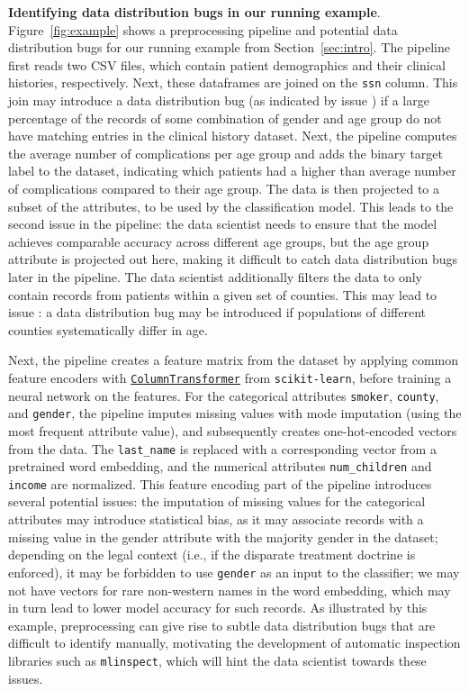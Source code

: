 \documentclass[11pt]{article}
\newcommand*{\ie}{i.e.,\xspace}
\newcommand{\sklearn}{\stt{scikit-learn}\xspace}
\newcommand{\mlinspect}{\stt{mlinspect}\xspace}
\newcommand{\header}[1]{\vspace{1mm}\noindent\textbf{#1}.}
\newcommand*\circled[1]{\tikz[baseline=(char.base)]{\node[shape=circle,fill=black,draw,inner sep=0.6pt] (char) {\textcolor{white}{\footnotesize \textbf{#1}}};}}
\newcommand{\shref}[2]{{\footnotesize\href{#1}{#2}}}
\newcommand{\stt}[1]{{\footnotesize\texttt{#1}}}
\begin{document}
\header{Identifying data distribution bugs in our running example} Figure~\ref{fig:example} shows a  preprocessing pipeline and potential data distribution bugs for our running example from Section~\ref{sec:intro}. The pipeline first reads two CSV files, which contain patient demographics and their clinical histories, respectively. Next, these dataframes are joined on the \stt{ssn} column. This join may introduce a data distribution bug (as indicated by issue \circled{1}) if a large percentage of the records of some combination of gender and age group do not have matching entries in the clinical history dataset. Next, the pipeline computes the average number of complications per age group and adds the binary target label to the dataset,  indicating which patients had a higher than average number of complications compared to their age group. The data is then projected to a subset of the attributes, to be used by the classification model. This leads to the second issue \circled{2} in the pipeline: the data scientist needs to ensure that the model achieves comparable accuracy across different age groups, but the age group attribute is projected out here, making it difficult to catch data distribution bugs later in the pipeline. The data scientist additionally filters the data to only contain records from patients within a given set of counties.  This may  lead to issue \circled{3}: a data distribution bug may be introduced if populations of different counties systematically differ in age.

Next, the pipeline creates a feature matrix from the dataset by applying common feature encoders with  \shref{https://scikit-learn.org/stable/modules/generated/sklearn.compose.ColumnTransformer.html}{\texttt{ColumnTransformer}} from \sklearn, before training a neural network on the features.   For the categorical attributes \stt{smoker}, \stt{county}, and \stt{gender}, the pipeline imputes missing values with mode imputation (using the most frequent attribute value), and subsequently creates one-hot-encoded vectors from the data. The \stt{last\_name} is replaced with a corresponding vector from a pretrained word embedding, and the numerical attributes \stt{num\_children} and \stt{income} are normalized. This feature encoding part of the pipeline introduces several potential issues: \circled{4} the imputation of missing values for the categorical attributes may introduce statistical bias, as it may associate records with a missing value in the gender attribute with the majority gender in the dataset; \circled{5} depending on the legal context (\ie if the disparate treatment doctrine is enforced), it may be forbidden to use \stt{gender}  as an input to the classifier; \circled{6} we may not have vectors for rare non-western names in the word embedding, which may in turn lead to lower model accuracy for such records. As illustrated by this example, preprocessing can give rise to subtle data distribution bugs that are difficult to identify manually, motivating the development of automatic inspection libraries such as \mlinspect, which will hint the data scientist towards these issues.
\end{document}
